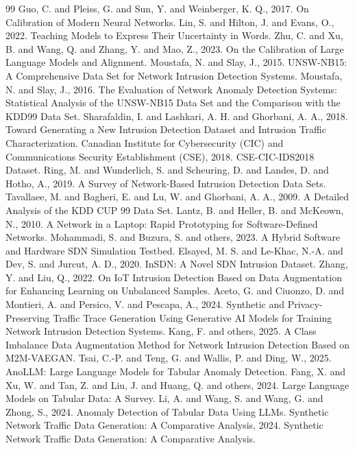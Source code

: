 \documentclass[12pt,a4paper]{article}
\begin{document}
\begin{thebibliography}{99}
 Guo, C. and Pleiss, G. and Sun, Y. and Weinberger, K. Q., 2017. On Calibration of Modern Neural Networks.
 Lin, S. and Hilton, J. and Evans, O., 2022. Teaching Models to Express Their Uncertainty in Words.
 Zhu, C. and Xu, B. and Wang, Q. and Zhang, Y. and Mao, Z., 2023. On the Calibration of Large Language Models and Alignment.
 Moustafa, N. and Slay, J., 2015. UNSW-NB15: A Comprehensive Data Set for Network Intrusion Detection Systems.
 Moustafa, N. and Slay, J., 2016. The Evaluation of Network Anomaly Detection Systems: Statistical Analysis of the UNSW-NB15 Data Set and the Comparison with the KDD99 Data Set.
 Sharafaldin, I. and Lashkari, A. H. and Ghorbani, A. A., 2018. Toward Generating a New Intrusion Detection Dataset and Intrusion Traffic Characterization.
 Canadian Institute for Cybersecurity (CIC) and Communications Security Establishment (CSE), 2018. CSE-CIC-IDS2018 Dataset.
 Ring, M. and Wunderlich, S. and Scheuring, D. and Landes, D. and Hotho, A., 2019. A Survey of Network-Based Intrusion Detection Data Sets.
 Tavallaee, M. and Bagheri, E. and Lu, W. and Ghorbani, A. A., 2009. A Detailed Analysis of the KDD CUP 99 Data Set.
 Lantz, B. and Heller, B. and McKeown, N., 2010. A Network in a Laptop: Rapid Prototyping for Software-Defined Networks.
 Mohammadi, S. and Buzura, S. and others, 2023. A Hybrid Software and Hardware SDN Simulation Testbed.
 Elsayed, M. S. and Le-Khac, N.-A. and Dev, S. and Jurcut, A. D., 2020. InSDN: A Novel SDN Intrusion Dataset.
 Zhang, Y. and Liu, Q., 2022. On IoT Intrusion Detection Based on Data Augmentation for Enhancing Learning on Unbalanced Samples.
 Aceto, G. and Ciuonzo, D. and Montieri, A. and Persico, V. and Pescapa, A., 2024. Synthetic and Privacy-Preserving Traffic Trace Generation Using Generative AI Models for Training Network Intrusion Detection Systems.
 Kang, F. and others, 2025. A Class Imbalance Data Augmentation Method for Network Intrusion Detection Based on M2M-VAEGAN.
 Tsai, C.-P. and Teng, G. and Wallis, P. and Ding, W., 2025. AnoLLM: Large Language Models for Tabular Anomaly Detection.
 Fang, X. and Xu, W. and Tan, Z. and Liu, J. and Huang, Q. and others, 2024. Large Language Models on Tabular Data: A Survey.
 Li, A. and Wang, S. and Wang, G. and Zhong, S., 2024. Anomaly Detection of Tabular Data Using LLMs.
 Synthetic Network Traffic Data Generation: A Comparative Analysis, 2024. Synthetic Network Traffic Data Generation: A Comparative Analysis.

\end{thebibliography}
\end{document}
